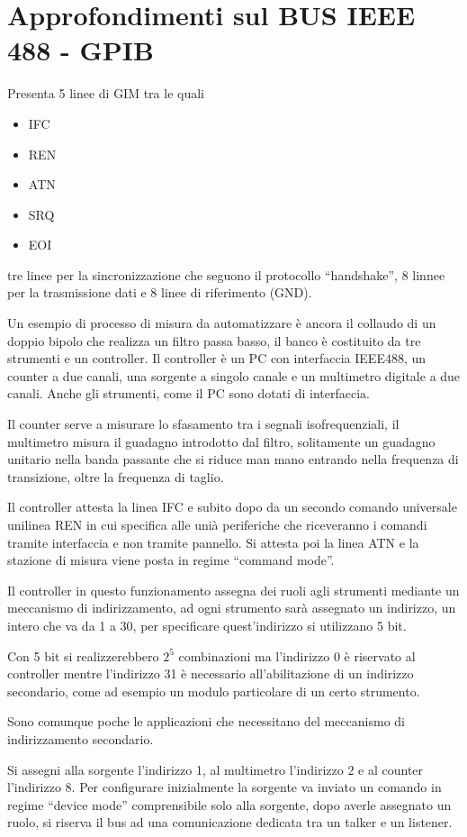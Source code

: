 
\section{Approfondimenti sul BUS IEEE 488 - GPIB}
Presenta 5 linee di GIM tra le quali
\begin{itemize}
 \item IFC
 \item REN
 \item ATN
 \item SRQ
 \item EOI
\end{itemize}
tre linee per la sincronizzazione che seguono il protocollo ``handshake'',
8 linnee per la trasmissione dati e 8 linee di riferimento (GND).

Un esempio di processo di misura da automatizzare è ancora il collaudo di un
doppio bipolo che realizza un filtro passa basso, il banco è costituito da tre
strumenti e un controller.
Il controller è un PC con interfaccia IEEE488, un counter a due canali, una
sorgente a singolo canale e un multimetro digitale a due canali.
Anche gli strumenti, come il PC sono dotati di interfaccia.

Il counter serve a misurare lo sfasamento tra i segnali isofrequenziali, il
multimetro misura il guadagno introdotto dal filtro, solitamente un guadagno
unitario nella banda passante che si riduce man mano entrando nella frequenza
di transizione, oltre la frequenza di taglio.

Il controller attesta la linea IFC e subito dopo da un secondo comando
universale unilinea REN in cui specifica alle unià periferiche che riceveranno
i comandi tramite interfaccia e non tramite pannello. Si attesta poi la linea
ATN e la stazione di misura viene posta in regime ``command mode''.

Il controller in questo funzionamento assegna dei ruoli agli strumenti mediante
un meccanismo di indirizzamento, ad ogni strumento sarà assegnato un indirizzo,
un intero che va da 1 a 30, per specificare quest'indirizzo si utilizzano 5 bit.

Con 5 bit si realizzerebbero $2^5$ combinazioni ma l'indirizzo 0 è riservato al
controller mentre l'indirizzo 31 è necessario all'abilitazione di un indirizzo
secondario, come ad esempio un modulo particolare di un certo strumento.

Sono comunque poche le applicazioni che necessitano del meccanismo di
indirizzamento secondario.

Si assegni alla sorgente l'indirizzo 1, al multimetro l'indirizzo 2 e al
counter l'indirizzo 8.
Per configurare inizialmente la sorgente va inviato un comando in regime
``device mode'' comprensibile solo alla sorgente, dopo averle assegnato un
ruolo, si riserva il bus ad una comunicazione dedicata tra un talker e un
listener.

